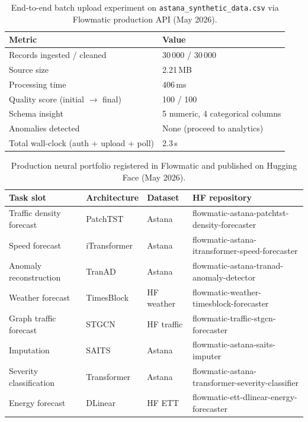 
\begin{table}[H]
  \centering
  \caption{End-to-end batch upload experiment on \texttt{astana\_synthetic\_data.csv} via Flowmatic production API (May 2026).}
  \label{tab:upload-pipeline-experiment}
  \begin{tabular}{@{}ll@{}}
    \toprule
    \textbf{Metric} & \textbf{Value} \\
    \midrule
    Records ingested / cleaned & 30\,000 / 30\,000 \\
    Source size & 2.21\,MB \\
    Processing time & 406\,ms \\
    Quality score (initial $\rightarrow$ final) & 100 / 100 \\
    Schema insight & 5 numeric, 4 categorical columns \\
    Anomalies detected & None (proceed to analytics) \\
    Total wall-clock (auth + upload + poll) & 2.3\,s \\
    \bottomrule
  \end{tabular}
\end{table}

\begin{table}[H]
  \centering
  \caption{Production neural portfolio registered in Flowmatic and published on Hugging Face (May 2026).}
  \label{tab:production-portfolio}
  \footnotesize
  \setlength{\tabcolsep}{4pt}
  \begin{tabularx}{\linewidth}{@{}>{\raggedright\arraybackslash}p{2.2cm} l l >{\raggedright\arraybackslash\ttfamily}X@{}}
    \toprule
    \textbf{Task slot} & \textbf{Architecture} & \textbf{Dataset} & \textbf{HF repository} \\
    \midrule
    Traffic density forecast & PatchTST & Astana & flowmatic-astana-patchtst-density-forecaster \\
    Speed forecast & iTransformer & Astana & flowmatic-astana-itransformer-speed-forecaster \\
    Anomaly reconstruction & TranAD & Astana & flowmatic-astana-tranad-anomaly-detector \\
    Weather forecast & TimesBlock & HF weather & flowmatic-weather-timesblock-forecaster \\
    Graph traffic forecast & STGCN & HF traffic & flowmatic-traffic-stgcn-forecaster \\
    Imputation & SAITS & Astana & flowmatic-astana-saits-imputer \\
    Severity classification & Transformer & Astana & flowmatic-astana-transformer-severity-classifier \\
    Energy forecast & DLinear & HF ETT & flowmatic-ett-dlinear-energy-forecaster \\
    \bottomrule
  \end{tabularx}
\end{table}

